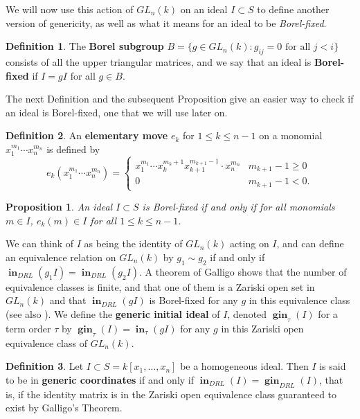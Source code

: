 \documentclass[11pt]{article}
\DeclareMathOperator{\Init}{\mathbf{in}}
\DeclareMathOperator{\gin}{\mathbf{gin}}
\newtheorem{proposition}{Proposition}
\theoremstyle{definition}
\newtheorem{definition}{Definition}
\begin{document}
We will now use this action of $GL_n(k)$ on an ideal $I \subset S$ to define another version of genericity, as well as what it means for an ideal to be \emph{Borel-fixed}.

\begin{definition}\label{def:borel}
	The \textbf{Borel subgroup} $B = \{g \in GL_n(k) : g_{ij} = 0 \text{ for all } j < i\}$ consists of all the upper triangular matrices, and we say that an ideal is \textbf{Borel-fixed} if $I = gI$ for all $g \in B$. 
\end{definition}


The next Definition and the subsequent Proposition give an easier way to check if an ideal is Borel-fixed, one that we will use later on. 


\begin{definition}\label{def:emove}
	An \textbf{elementary move} $e_k$ for $1 \leq k \leq n - 1$ on a monomial $x_1^{m_1} \cdots x_n^{m_n}$ is defined by \[ e_k(x_1^{m_1} \cdots x_n^{m_n}) = \begin{cases} 
		x_1^{m_1} \cdots x_{k}^{m_k + 1} x_{k + 1}^{m_{k+1} - 1} \cdot x_n^{m_n} & m_{k + 1} - 1 \geq 0 \\
		0 & m_{k + 1} - 1 < 0.
	\end{cases} \]
\end{definition}


\begin{proposition}
	\cite{green1998generic} An ideal $I \subset S$ is Borel-fixed if and only if for all monomials $m \in I$, $e_k(m) \in I$ for all $1 \leq k \leq n - 1$. 
\end{proposition}


We can think of $I$ as being the identity of $GL_n(k)$ acting on $I$, and can define an equivalence relation on $GL_n(k)$ by $g_1 \sim g_2$ if and only if $\Init_{DRL}(g_1 I) = \Init_{DRL}(g_2 I)$. A theorem of Galligo \cite{galligo1974propos} shows that the number of equivalence classes is finite, and that one of them is a Zariski open set in $GL_n(k)$ and that $\Init_{DRL}(gI)$ is Borel-fixed for any $g$ in this equivalence class (see also \cite{miller2005combinatorial}). We define the \textbf{generic initial ideal} of $I$, denoted $\gin_{\tau}(I)$ for a term order $\tau$ by $\gin_\tau(I) = \Init_\tau(gI)$ for any $g$ in this Zariski open equivalence class of $GL_n(k)$. 


\begin{definition}\label{def:genC}
	Let $I \subset S = k[x_1, \dots, x_n]$ be a homogeneous ideal. Then $I$ is said to be in \textbf{generic coordinates} if and only if $\Init_{DRL}(I) = \gin_{DRL}(I)$, that is, if the identity matrix is in the Zariski open equivalence class guaranteed to exist by Galligo's Theorem. 
\end{definition} 
\end{document}
